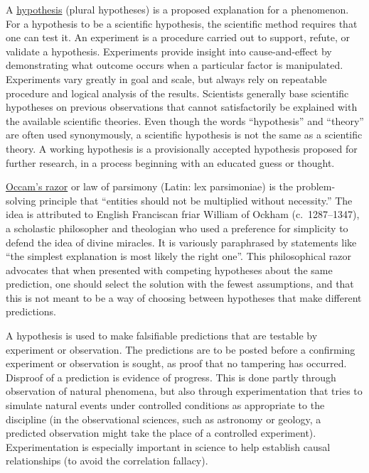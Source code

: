 A \href{https://en.wikipedia.org/wiki/Hypothesis}{hypothesis} (plural hypotheses) is a proposed explanation for a phenomenon. For a hypothesis to be a scientific hypothesis, the scientific method requires that one can test it. An experiment is a procedure carried out to support, refute, or validate a hypothesis. Experiments provide insight into cause-and-effect by demonstrating what outcome occurs when a particular factor is manipulated. Experiments vary greatly in goal and scale, but always rely on repeatable procedure and logical analysis of the results. Scientists generally base scientific hypotheses on previous observations that cannot satisfactorily be explained with the available scientific theories. Even though the words ``hypothesis'' and ``theory'' are often used synonymously, a scientific hypothesis is not the same as a scientific theory. A working hypothesis is a provisionally accepted hypothesis proposed for further research, in a process beginning with an educated guess or thought.

\href{https://en.wikipedia.org/wiki/Occam\%27s_razor}{Occam's razor} or law of parsimony (Latin: lex parsimoniae) is the problem-solving principle that ``entities should not be multiplied without necessity.'' The idea is attributed to English Franciscan friar William of Ockham (c.~1287--1347), a scholastic philosopher and theologian who used a preference for simplicity to defend the idea of divine miracles. It is variously paraphrased by statements like ``the simplest explanation is most likely the right one''. This philosophical razor advocates that when presented with competing hypotheses about the same prediction, one should select the solution with the fewest assumptions, and that this is not meant to be a way of choosing between hypotheses that make different predictions.

A hypothesis is used to make falsifiable predictions that are testable by experiment or observation. The predictions are to be posted before a confirming experiment or observation is sought, as proof that no tampering has occurred. Disproof of a prediction is evidence of progress. This is done partly through observation of natural phenomena, but also through experimentation that tries to simulate natural events under controlled conditions as appropriate to the discipline (in the observational sciences, such as astronomy or geology, a predicted observation might take the place of a controlled experiment). Experimentation is especially important in science to help establish causal relationships (to avoid the correlation fallacy).


